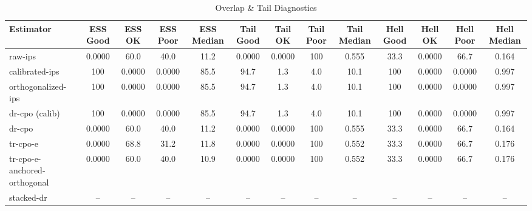 \begin{table}[htbp]
\centering
\caption{Overlap & Tail Diagnostics}
\label{tab:A3}
\begin{tabular}{l|cccccccccccc}
\toprule
Estimator & ESS Good & ESS OK & ESS Poor & ESS Median & Tail Good & Tail OK & Tail Poor & Tail Median & Hell Good & Hell OK & Hell Poor & Hell Median \\
\midrule
raw-ips & 0.0000 & 60.0 & 40.0 & 11.2 & 0.0000 & 0.0000 & 100 & 0.555 & 33.3 & 0.0000 & 66.7 & 0.164 \\
calibrated-ips & 100 & 0.0000 & 0.0000 & 85.5 & 94.7 & 1.3 & 4.0 & 10.1 & 100 & 0.0000 & 0.0000 & 0.997 \\
orthogonalized-ips & 100 & 0.0000 & 0.0000 & 85.5 & 94.7 & 1.3 & 4.0 & 10.1 & 100 & 0.0000 & 0.0000 & 0.997 \\
dr-cpo (calib) & 100 & 0.0000 & 0.0000 & 85.5 & 94.7 & 1.3 & 4.0 & 10.1 & 100 & 0.0000 & 0.0000 & 0.997 \\
dr-cpo & 0.0000 & 60.0 & 40.0 & 11.2 & 0.0000 & 0.0000 & 100 & 0.555 & 33.3 & 0.0000 & 66.7 & 0.164 \\
tr-cpo-e & 0.0000 & 68.8 & 31.2 & 11.8 & 0.0000 & 0.0000 & 100 & 0.552 & 33.3 & 0.0000 & 66.7 & 0.176 \\
tr-cpo-e-anchored-orthogonal & 0.0000 & 60.0 & 40.0 & 10.9 & 0.0000 & 0.0000 & 100 & 0.552 & 33.3 & 0.0000 & 66.7 & 0.176 \\
stacked-dr & -- & -- & -- & -- & -- & -- & -- & -- & -- & -- & -- & -- \\
\bottomrule
\end{tabular}
\end{table}